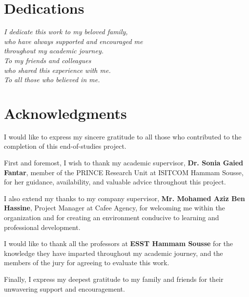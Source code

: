 \documentclass[12pt,a4paper,oneside]{report}
\begin{document}

\chapter*{Dedications}
\vspace{2cm}
\begin{center}
\textit{I dedicate this work to my beloved family, \\
who have always supported and encouraged me \\
throughout my academic journey.\\[1cm]
To my friends and colleagues \\
who shared this experience with me.\\[1cm]
To all those who believed in me.}
\end{center}
\newpage

\chapter*{Acknowledgments}

I would like to express my sincere gratitude to all those who contributed to the completion of this end-of-studies project.

First and foremost, I wish to thank my academic supervisor, \textbf{Dr. Sonia Gaied Fantar}, member of the PRINCE Research Unit at ISITCOM Hammam Sousse, for her guidance, availability, and valuable advice throughout this project.

I also extend my thanks to my company supervisor, \textbf{Mr. Mohamed Aziz Ben Hassine}, Project Manager at Cafee Agency, for welcoming me within the organization and for creating an environment conducive to learning and professional development.

I would like to thank all the professors at \textbf{ESST Hammam Sousse} for the knowledge they have imparted throughout my academic journey, and the members of the jury for agreeing to evaluate this work.

Finally, I express my deepest gratitude to my family and friends for their unwavering support and encouragement.

\newpage
\end{document}
